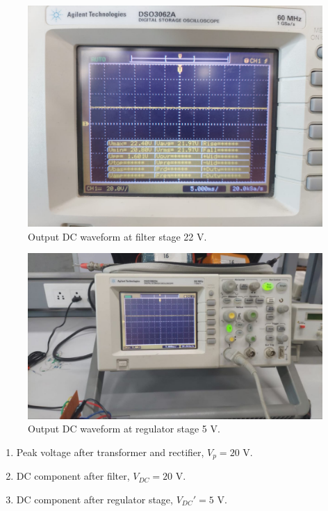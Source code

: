 \documentclass[journal,12pt,twocolumn]{IEEEtran}
\begin{document}
	\begin{figure}[!ht]
		\includegraphics[width=\columnwidth]{figs/c_4.jpg}
		\caption{Output DC waveform at filter stage 22 V.}
		\label{fig:filter}
	\end{figure}
	
	\begin{figure}[!ht]
		\includegraphics[width=\columnwidth]{figs/c_5.jpg}
		\caption{Output DC waveform at regulator stage 5 V.}
		\label{fig:regulator_dc}
	\end{figure}
	
	
	\begin{enumerate}
		\item Peak voltage after transformer and rectifier, 
		$V_p = 20$ V.
		\item DC component after filter, 
		$V_{DC} = 20$ V.
		\item DC component after regulator stage, $V_{DC}' = 5$ V.
	\end{enumerate}
\end{document}
